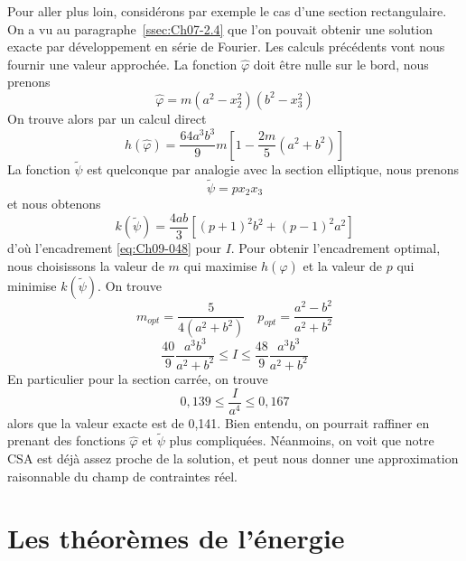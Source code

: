 Pour aller plus loin, considérons par exemple le cas d'une section rectangulaire.
On a vu au paragraphe~\ref{ssec:Ch07-2.4} que l'on pouvait obtenir une solution exacte par développement en série de Fourier.
Les calculs précédents vont nous fournir une valeur approchée.
La fonction $\hat{\varphi}$ doit être nulle sur le bord, nous prenons 
\begin{equation}
    \hat{\varphi} = m (a^2 - x_2^2) (b^2 -x_3^2)
    \label{eq:Ch09-050}
\end{equation}
On trouve alors par un calcul direct 
\begin{equation}
    h\left( \hat{\varphi} \right) = \frac{64 a^3 b^3}{9} m \left[ 1 - \frac{2m}{5}\left( a^2 + b^2 \right) \right]
    \label{eq:Ch09-051}
\end{equation}
La fonction $\tilde{\psi}$ est quelconque par analogie avec la section elliptique, nous prenons 
\begin{equation}
    \tilde{\psi} = p x_2 x_3
    \label{eq:Ch09-052}
\end{equation}
et nous obtenons 
\begin{equation}
    k\left( \tilde{\psi} \right) = \frac{4 ab}{3} \left[ (p+1)^2 b^2 + (p-1)^2 a^2 \right]
    \label{eq:Ch09-053}
\end{equation}
d'où l'encadrement \eqref{eq:Ch09-048} pour $I$.
Pour obtenir l'encadrement optimal, nous choisissons la valeur de $m$ qui maximise $h(\hat{\varphi})$ et la valeur de $p$ qui minimise $k(\tilde{\psi})$.
On trouve 
\[
m_{opt} = \frac{5}{4\left( a^2 + b^2\right)} \quad p_{opt} = \frac{a^2-b^2}{a^2+b^2}
\]
\begin{equation}
    \frac{40}{9} \frac{a^3 b^3}{a^2 + b^2} \leq I \leq \frac{48}{9} \frac{a^3 b^3}{a^2 +b^2}
    \label{eq:Ch09-054}
\end{equation}
En particulier pour la section carrée, on trouve 
\begin{equation}
    0,139 \leq \frac{I}{a^4} \leq 0,167
    \label{eq:Ch09-055}
\end{equation}
alors que la valeur exacte est de 0,141.
Bien entendu, on pourrait raffiner en prenant des fonctions $\hat{\varphi}$ et $\tilde{\psi}$ plus compliquées.
Néanmoins, on voit que notre CSA est déjà assez proche de la solution, et peut nous donner une approximation raisonnable du champ de contraintes réel. 

\section{Les théorèmes de l'énergie} \label{sec:Ch09-2}
